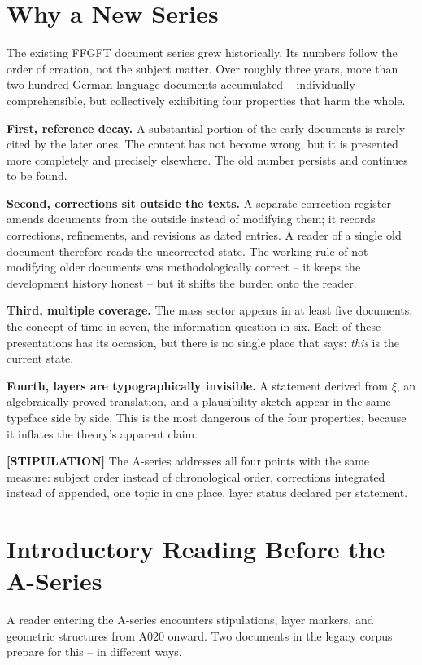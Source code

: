 \section{Why a New Series}

The existing FFGFT document series grew historically. Its numbers follow the
order of creation, not the subject matter. Over roughly three years, more than
two hundred German-language documents accumulated -- individually comprehensible,
but collectively exhibiting four properties that harm the whole.

\textbf{First, reference decay.} A substantial portion of the early documents
is rarely cited by the later ones. The content has not become wrong, but it is
presented more completely and precisely elsewhere. The old number persists and
continues to be found.

\textbf{Second, corrections sit outside the texts.} A separate correction
register amends documents from the outside instead of modifying them; it records
corrections, refinements, and revisions as dated entries. A reader of a single
old document therefore reads the uncorrected state. The working rule of not
modifying older documents was methodologically correct -- it keeps the
development history honest -- but it shifts the burden onto the reader.

\textbf{Third, multiple coverage.} The mass sector appears in at least five
documents, the concept of time in seven, the information question in six. Each
of these presentations has its occasion, but there is no single place that says:
\emph{this} is the current state.

\textbf{Fourth, layers are typographically invisible.} A statement derived
from $\xi$, an algebraically proved translation, and a plausibility sketch
appear in the same typeface side by side. This is the most dangerous of the four
properties, because it inflates the theory's apparent claim.

\textbf{[STIPULATION]} The A-series addresses all four points with the same
measure: subject order instead of chronological order, corrections integrated
instead of appended, one topic in one place, layer status declared per
statement.

\section{Introductory Reading Before the A-Series}

A reader entering the A-series encounters stipulations, layer markers, and
geometric structures from A020 onward. Two documents in the legacy corpus
prepare for this -- in different ways.

